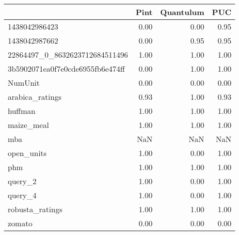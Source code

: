 \begin{tabular}{lrrr}
\toprule
{} &  Pint &  Quantulum &   PUC \\
\midrule
1438042986423                    &  0.00 &       0.00 &  0.95 \\
1438042987662                    &  0.00 &       0.95 &  0.95 \\
22864497\_0\_8632623712684511496   &  1.00 &       1.00 &  1.00 \\
3b5902071ea0f7e0cde6955fb6e474ff &  0.00 &       1.00 &  1.00 \\
NumUnit                          &  0.00 &       0.00 &  0.00 \\
arabica\_ratings                  &  0.93 &       1.00 &  0.93 \\
huffman                          &  1.00 &       1.00 &  1.00 \\
maize\_meal                       &  1.00 &       1.00 &  1.00 \\
mba                              &   NaN &        NaN &   NaN \\
open\_units                       &  1.00 &       0.00 &  1.00 \\
phm                              &  1.00 &       1.00 &  1.00 \\
query\_2                          &  1.00 &       0.00 &  1.00 \\
query\_4                          &  1.00 &       0.00 &  1.00 \\
robusta\_ratings                  &  1.00 &       1.00 &  1.00 \\
zomato                           &  0.00 &       0.00 &  0.00 \\
\bottomrule
\end{tabular}
